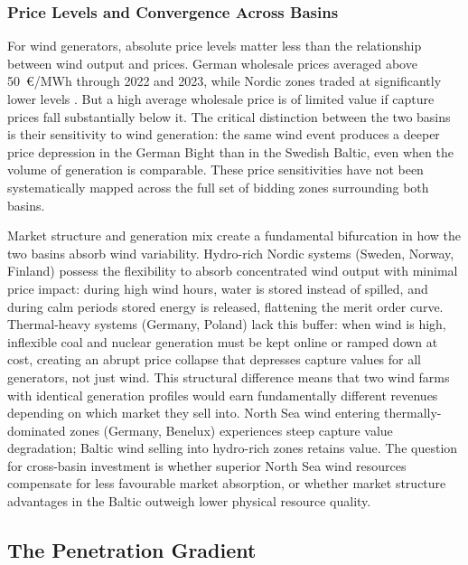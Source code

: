 \subsubsection{Price Levels and Convergence Across Basins}\label{sec:price_comparison}

For wind generators, absolute price levels matter less than the relationship between wind output and prices. German wholesale prices averaged above 50~\euro/MWh through 2022 and 2023, while Nordic zones traded at significantly lower levels \cite{GermanPrices2023, ACER2025}. But a high average wholesale price is of limited value if capture prices fall substantially below it. The critical distinction between the two basins is their sensitivity to wind generation: the same wind event produces a deeper price depression in the German Bight than in the Swedish Baltic, even when the volume of generation is comparable. These price sensitivities have not been systematically mapped across the full set of bidding zones surrounding both basins.

\vspace{4pt}

Market structure and generation mix create a fundamental bifurcation in how the two basins absorb wind variability. Hydro-rich Nordic systems (Sweden, Norway, Finland) possess the flexibility to absorb concentrated wind output with minimal price impact: during high wind hours, water is stored instead of spilled, and during calm periods stored energy is released, flattening the merit order curve. Thermal-heavy systems (Germany, Poland) lack this buffer: when wind is high, inflexible coal and nuclear generation must be kept online or ramped down at cost, creating an abrupt price collapse that depresses capture values for all generators, not just wind. This structural difference means that two wind farms with identical generation profiles would earn fundamentally different revenues depending on which market they sell into. North Sea wind entering thermally-dominated zones (Germany, Benelux) experiences steep capture value degradation; Baltic wind selling into hydro-rich zones retains value. The question for cross-basin investment is whether superior North Sea wind resources compensate for less favourable market absorption, or whether market structure advantages in the Baltic outweigh lower physical resource quality.

\subsection{The Penetration Gradient}\label{sec:penetration_gradient}

